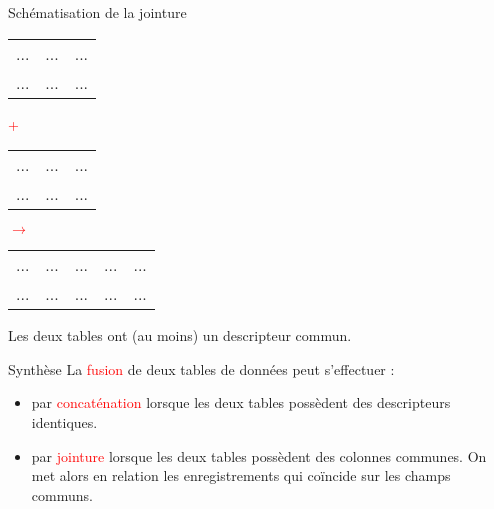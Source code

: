 \documentclass[10pt]{beamer}
\begin{document}
\begin{frame}
    \mframe{\FT}
    \begin{block}{Schématisation de la jointure}
        \begin{center}
        \begin{tabular}{|c|c|c|}
            \hline
            \cellcolor{green!25}{\quad} & \cellcolor{red!25}{\quad} & \cellcolor{red!25}{\quad} \\
            \hline
             ... & ... & ... \\
            \hline
            ... & ... & ... \\
            \hline
        \end{tabular} {\huge\textcolor{red}{+}} 
        \begin{tabular}{|c|c|c|}
            \hline
            \cellcolor{green!25}{\quad} & \cellcolor{blue!25}{\quad} & \cellcolor{blue!25}{\quad} \\
            \hline
             ... & ... & ... \\
            \hline
            ... & ... & ... \\
            \hline
        \end{tabular} {\huge\textcolor{red}{$\rightarrow$}} 
        \begin{tabular}{|c|c|c|c|c|}
            \hline
            \cellcolor{green!25}{\quad} & \cellcolor{red!25}{\quad} & \cellcolor{red!25}{\quad} & \cellcolor{blue!25}{\quad} & \cellcolor{blue!25}{\quad} \\
            \hline
             ... & ... & ... &  ... & ... \\
            \hline
            ... & ... & ...  & ... & ... \\
            \hline
        \end{tabular}
    \end{center}
    Les deux tables ont (au moins) un descripteur commun.
    \end{block}
\end{frame}

\begin{frame}
    \mframe{\FT}
    \begin{alertblock}{Synthèse}
        La \textcolor{red}{fusion} de deux tables de données peut s'effectuer :
        \begin{itemize}
            \item<1-> par \textcolor{red}{concaténation} lorsque les deux tables possèdent des descripteurs identiques.
            \item<2-> par \textcolor{red}{jointure} lorsque les deux tables possèdent des colonnes communes. On met alors en relation les enregistrements qui coïncide sur les champs communs.
        \end{itemize}
    \end{alertblock}
\end{frame}
\end{document}
